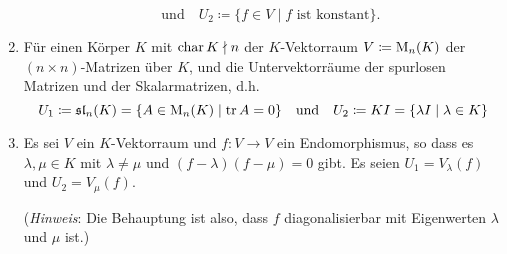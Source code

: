 \begin{question}[subtitle = Idempotente konstruieren]{3}
\begin{enumerate}[leftmargin=*]
\[        \quad\text{und}\quad
        U_2 \coloneqq \{f \in V \mid \text{$f$ ist konstant}\}.
      \]
%       
    \item
      Für einen Körper $K$ mit $\operatorname{char} K \nmid n$ der $K$-Vektorraum $V \coloneqq \operatorname{M}_n(K)$ der $(n \times n)$-Matrizen über $K$, und die Untervektorräume der spurlosen Matrizen und der Skalarmatrizen, d.h.\
      \[
        U_1 \coloneqq \mathfrak{sl}_n(K) = \{ A \in \operatorname{M}_n(K) \mid \operatorname{tr} A  = 0 \}
        \quad\text{und}\quad
        U_2 \coloneqq K I = \{ \lambda I \mid \lambda \in K \}
      \]
    \item
      Es sei $V$ ein $K$-Vektorraum und $f \colon V \to V$ ein Endomorphismus, so dass es $\lambda, \mu \in K$ mit $\lambda \neq \mu$ und $(f-\lambda)(f-\mu) = 0$ gibt.
      Es seien $U_1 = V_\lambda(f)$ und $U_2 = V_\mu(f)$.
      
      (\emph{Hinweis}:
       Die Behauptung ist also, dass $f$ diagonalisierbar mit Eigenwerten $\lambda$ und $\mu$ ist.)
  \end{enumerate}
\end{question}


